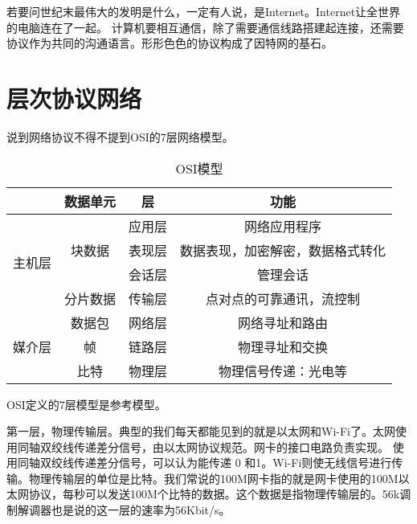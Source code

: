 

若要问世纪末最伟大的发明是什么，一定有人说，是Internet。Internet让全世界的电脑连在了一起。
计算机要相互通信，除了需要通信线路搭建起连接，还需要协议作为共同的沟通语言。形形色色的协议构成了因特网的基石。

\section{层次协议网络}

说到网络协议不得不提到OSI的7层网络模型。

\begin{table}[h]
\begin{center}
\caption{OSI模型}\label{tabel:ISOmodule}
\begin{tabular}{|c|c|c|c|}
\hline
& 数据单元 & 层 & 功能  \\ \hline %
\multirow{4}{*}{主机层}   &  \multirow{3}{*}{块数据} & 应用层  &  网络应用程序  \\ \cline{3-4}
&						 & 表现层 & 数据表现，加密解密，数据格式转化  \\ \cline{3-4}
&						 & 会话层 & 管理会话 \\ \cline{2-4}
& 分片数据  & 传输层 & 点对点的可靠通讯，流控制 \\ \hline
\multirow{3}{*}{媒介层}  & 数据包   & 网络层 & 网络寻址和路由 \\ \cline{2-4}
& 帧 & 链路层 & 物理寻址和交换 \\ \cline{2-4}
& 比特 & 物理层 & 物理信号传递：光电等 \\\hline
\end{tabular}
\end{center}
\end{table}

OSI定义的7层模型是参考模型。

第一层，物理传输层。典型的我们每天都能见到的就是以太网和Wi-Fi了。太网使用同轴双绞线传递差分信号，由以太网协议规范。网卡的接口电路负责实现。
使用同轴双绞线传递差分信号，可以认为能传递 0 和1。Wi-Fi则使无线信号进行传输。物理传输层的单位是比特。我们常说的100M网卡指的就是网卡使用的100M以太网协议，每秒可以发送100M个比特的数据。这个数据是指物理传输层的。56k调制解调器也是说的这一层的速率为56Kbit/s。


